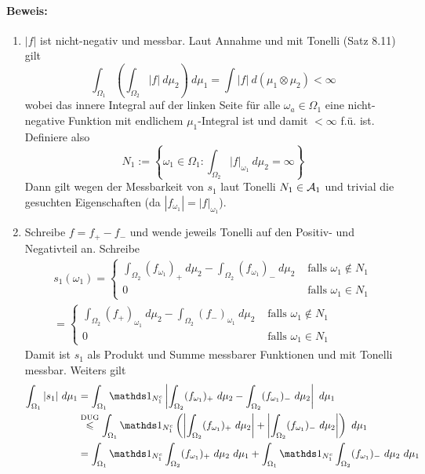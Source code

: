 \documentclass[11pt]{report}
\begin{document}
\paragraph{Beweis:}
\begin{enumerate}[label=(\roman*)]
    \item $|f|$ ist nicht-negativ und messbar. Laut Annahme und mit Tonelli (Satz 8.11) gilt
    $$\int_{\Omega_1}\left(\int_{\Omega_2}|f|\ d\mu_2\right)\ d\mu_1=\int |f|\ d(\mu_1\otimes\mu_2)<\infty$$
    wobei das innere Integral auf der linken Seite f\"ur alle $\omega_a\in\Omega_1$ eine nicht-negative Funktion mit endlichem $\mu_1$-Integral ist und damit $<\infty$ f.\"u. ist. Definiere also
    $$N_1:=\left\{\omega_1\in\Omega_1:\int_{\Omega_2}|f|_{\omega_1}\ d\mu_2=\infty\right\}$$
    Dann gilt wegen der Messbarkeit von $s_1$ laut Tonelli $N_1\in\mathcal{A}_1$ und trivial die gesuchten Eigenschaften (da $|f_{\omega_1}|=|f|_{\omega_1}$).
    \item Schreibe $f=f_+-f_-$ und wende jeweils Tonelli auf den Positiv- und Negativteil an. Schreibe
    \begin{align*}
        s_1(\omega_1)=
        \begin{cases}
            \displaystyle\int_{\Omega_2}(f_{\omega_1})_+\ d\mu_2-\int_{\Omega_2}(f_{\omega_1})_-\ d\mu_2&\text{ falls }\omega_1\notin N_1 \\
            0&\text{ falls }\omega_1\in N_1
        \end{cases}\\
        =\begin{cases}
            \displaystyle\int_{\Omega_2}(f_+)_{\omega_1}\ d\mu_2-\int_{\Omega_2}(f_-)_{\omega_1}\ d\mu_2&\text{ falls }\omega_1\notin N_1 \\
            0&\text{ falls }\omega_1\in N_1
        \end{cases}
    \end{align*}
    Damit ist $s_1$ als Produkt und Summe messbarer Funktionen und mit Tonelli messbar. Weiters gilt
    \begin{align*}
        \int_{\Omega_1}|s_1|\ d\mu_1&=\int_{\Omega_1}\ind{N_1^c}\left|\int_{\Omega_2}(f_{\omega_1})_+\ d\mu_2-\int_{\Omega_2}(f_{\omega_1})_-\ d\mu_2\right|\ d\mu_1\\
        &\overset{\text{DUG}}{\leq}\int_{\Omega_1}\ind{N_1^c}\left(\left|\int_{\Omega_2}(f_{\omega_1})_+\ d\mu_2\right|+\left|\int_{\Omega_2}(f_{\omega_1})_-\ d\mu_2\right|\right)\ d\mu_1\\
        &=\int_{\Omega_1}\ind{N_1^c}\int_{\Omega_2}(f_{\omega_1})_+\ d\mu_2\ d\mu_1+\int_{\Omega_1}\ind{N_1^c}\int_{\Omega_2}(f_{\omega_1})_-  \ d\mu_2\ d\mu_1\\

\end{align*}
\end{enumerate}
\end{document}
